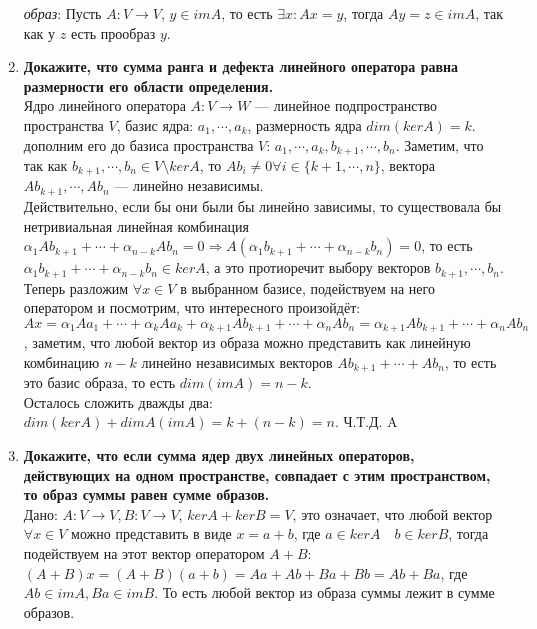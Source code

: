 \documentclass[12pt]{article} %
\begin{document}
\begin{enumerate}
    \textit{образ}: Пусть $A: V \rightarrow V$, $y \in imA$, то есть $\exists x: Ax = y$, тогда $Ay = z \in imA$, так как у $z$ есть прообраз $y$.
    
    \item \textbf{Докажите, что сумма ранга и дефекта линейного оператора равна размерности его области определения.}\\

    Ядро линейного оператора $A: V \rightarrow W$ --- линейное подпространство пространства $V$, базис ядра: $a_1, \cdots, a_k$, размерность ядра $dim(kerA) = k$. дополним его до базиса пространства $V$: $a_1, \cdots, a_k, b_{k + 1}, \cdots, b_n$. Заметим, что так как $b_{k + 1}, \cdots, b_n \in V \setminus kerA$, то $Ab_i \neq 0 \forall i \in \{k + 1, \cdots, n\}$, вектора $Ab_{k + 1}, \cdots, Ab_n$ --- линейно независимы.\\
    
    Действительно, если бы они были бы линейно зависимы, то существовала бы нетривиальная линейная комбинация $\alpha_1 Ab_{k + 1} + \cdots + \alpha_{n - k} A b_n = 0 \Rightarrow A(\alpha_1 b_{k + 1} + \cdots + \alpha_{n - k} b_n) = 0$, то есть $\alpha_1 b_{k + 1} + \cdots + \alpha_{n - k} b_n \in kerA$, а это протиоречит выбору векторов $b_{k + 1}, \cdots, b_n$.\\
    
    Теперь разложим $\forall x \in V$ в выбранном базисе, подействуем на него оператором и посмотрим, что интересного произойдёт: $Ax = \alpha_1 Aa_1 + \cdots + \alpha_k Aa_k + \alpha_{k + 1}Ab_{k + 1} + \cdots + \alpha_nAb_n = \alpha_{k + 1}Ab_{k + 1} + \cdots + \alpha_nAb_n$, заметим, что любой вектор из образа можно представить как линейную комбинацию $n - k$ линейно независимых векторов $Ab_{k + 1} + \cdots + Ab_n$, то есть это базис образа, то есть $dim(imA) = n - k$.\\
    
    Осталось сложить дважды два: $dim(kerA) + dimA(imA) = k + (n - k) = n$. Ч.Т.Д.
    A
    \item \textbf{Докажите, что если сумма ядер двух линейных операторов, действующих на одном пространстве, совпадает с этим пространством, то образ суммы равен сумме образов.}\\

    Дано: $A: V \rightarrow V, B: V \rightarrow V$, $kerA + kerB = V$, это означает, что любой вектор $\forall x \in V$ можно представить в виде $x = a + b$, где $a \in kerA \quad b \in kerB$, тогда подействуем на этот вектор оператором $A + B$: $(A + B)x = (A + B)(a + b) = Aa + Ab + Ba + Bb = Ab + Ba$, где $Ab \in imA, Ba \in imB$. То есть любой вектор из образа суммы лежит в сумме образов.\\
    

\end{enumerate}
\end{document}
